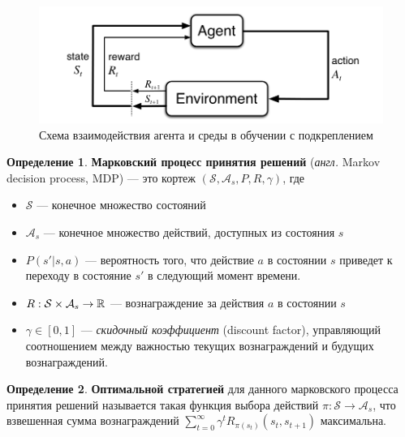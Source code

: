 \documentclass[specification,annotation,times]{itmo-student-thesis}
\theoremstyle{definition}
\newtheorem{definition-ru}{Определение}
\begin{document}
\begin{figure}[!h]
  \caption{Схема взаимодействия агента и среды в обучении с подкреплением}\label{rl-scheme}
  \centering
  \includegraphics[scale=0.5]{rl-scheme}
\end{figure}

\begin{definition-ru}
  \textbf{Марковский процесс принятия решений} (\textit{англ.} Markov decision process, MDP) ---
  это кортеж
  $(\mathcal{S}, \mathcal{A}_s, P, R, \gamma)$, где

  \begin{itemize}
  \item $\mathcal{S}$ --- конечное множество состояний
  \item $\mathcal{A}_s$ --- конечное множество действий, доступных из состояния
    $s$
  \item $P(s' | s, a)$ --- вероятность того, что действие $a$ в состоянии $s$
    приведет к переходу в состояние $s'$ в следующий момент времени.
  \item $R : \mathcal{S} \times \mathcal{A}_s \rightarrow \Bbb{R}$ ---
    вознаграждение за действия $a$ в состоянии $s$
  \item $\gamma \in [0, 1]$ --- \textit{скидочный коэффициент} (discount factor),
    управляющий соотношением между важностью текущих вознаграждений и будущих вознаграждений.
  \end{itemize}
\end{definition-ru}

\begin{definition-ru}
  \textbf{Оптимальной стратегией} для данного марковского процесса принятия
  решений называется такая функция выбора действий $\pi : \mathcal{S} \rightarrow \mathcal{A}_s$,
  что взвешенная сумма вознаграждений $\sum\limits_{t=0}^{\infty} {\gamma^t
    R_{\pi(s_t)}(s_t, s_{t+1})}$ максимальна.
\end{definition-ru}
\end{document}
